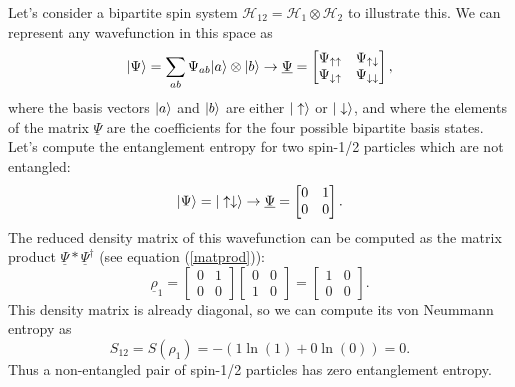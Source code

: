 Let's consider a bipartite spin system $\mathcal{H}_{12}=\mathcal{H}_1\otimes
\mathcal{H}_2$ to illustrate this. We can represent any wavefunction in this
space as
\begin{equation}\label{matrepres}
    |\Psi\rangle=\sum_{ab}\Psi_{ab}|a\rangle\otimes|b\rangle\to \underline{\Psi} =
    \begin{bmatrix} \Psi_{\uparrow\uparrow}&\Psi_{\uparrow\downarrow}\\ 
    \Psi_{\downarrow\uparrow}&\Psi_{\downarrow\downarrow}\end{bmatrix},
\end{equation}
where the basis vectors $|a\rangle$ and $|b\rangle$ are either $|\uparrow\rangle$ or $|\downarrow\rangle$, and
where the elements of the matrix $\underline{\Psi}$ are the coefficients for the four possible bipartite
basis states.
Let's compute the entanglement entropy for two spin-1/2 particles which are not entangled: 
\begin{equation}\label{noentangle}
    |\Psi\rangle=|\uparrow\downarrow\rangle\to\underline{\Psi}=\begin{bmatrix}0&1\\0&0\end{bmatrix}.
\end{equation}
The reduced density matrix of this wavefunction can be computed as the matrix
product $\underline{\Psi}*\underline{\Psi}^\dagger$ (see equation (\ref{matprod})):
\begin{equation}
    \underline{\rho}_1 = \begin{bmatrix}0&1\\0&0\end{bmatrix} \begin{bmatrix}0&0\\1&0\end{bmatrix}=\begin{bmatrix}1&0\\0&0\end{bmatrix}.
\end{equation}
This density matrix is already diagonal, so we can compute its von Neummann entropy
as
\begin{equation}
    S_{12}=S(\rho_1) = -(1\ln(1)+0\ln(0)) = 0.
\end{equation}
Thus a non-entangled pair of spin-1/2 particles has zero entanglement entropy.

